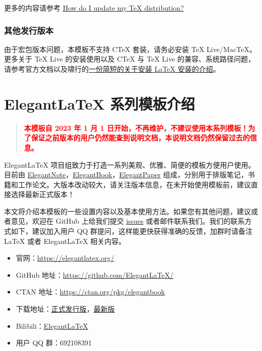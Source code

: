 \documentclass[lang=cn,newtx,10pt,scheme=chinese]{elegantbook}
\begin{document}
更多的内容请参考 \href{https://tex.stackexchange.com/questions/55437/how-do-i-update-my-tex-distribution}{How do I update my \TeX{} distribution?}

\subsection{其他发行版本}

由于宏包版本问题，本模板不支持 C\TeX{} 套装，请务必安装 TeX Live/Mac\TeX{}。更多关于 \TeX{} Live 的安装使用以及 C\TeX{} 与 \TeX{} Live 的兼容、系统路径问题，请参考官方文档以及啸行的\href{https://github.com/OsbertWang/install-latex-guide-zh-cn/releases/}{一份简短的关于安装 \LaTeX{} 安装的介绍}。



\chapter{Elegant\LaTeX{} 系列模板介绍}

\begin{quotation}
  \textbf{\textcolor{red}{本模板自 2023 年 1 月 1 日开始，不再维护，不建议使用本系列模板！为了保证之前版本的用户仍然能查到说明文档，本说明文档仍然保留过去的信息。}}
\end{quotation}

Elegant\LaTeX{} 项目组致力于打造一系列美观、优雅、简便的模板方便用户使用。目前由 \href{https://github.com/ElegantLaTeX/ElegantNote}{ElegantNote}，\href{https://github.com/ElegantLaTeX/ElegantBook}{ElegantBook}，\href{https://github.com/ElegantLaTeX/ElegantPaper}{ElegantPaper} 组成，分别用于排版笔记，书籍和工作论文。大版本改动较大，请关注版本信息，在未开始使用模板前，建议直接选择最新正式版本！


本文将介绍本模板的一些设置内容以及基本使用方法。如果您有其他问题，建议或者意见，欢迎在 GitHub 上给我们提交 \href{https://github.com/ElegantLaTeX/ElegantBook/issues}{issues} 或者邮件联系我们。我们的联系方式如下，建议加入用户 QQ 群提问，这样能更快获得准确的反馈，加群时请备注 \LaTeX{} 或者 Elegant\LaTeX{} 相关内容。
\begin{itemize}
  \item 官网：\href{https://elegantlatex.org/}{https://elegantlatex.org/}
  \item GitHub 地址：\href{https://github.com/ElegantLaTeX/}{https://github.com/ElegantLaTeX/}
  \item CTAN 地址：\href{https://ctan.org/pkg/elegantbook}{https://ctan.org/pkg/elegantbook}
  \item 下载地址：\href{https://github.com/ElegantLaTeX/ElegantBook/releases}{正式发行版}，\href{https://github.com/ElegantLaTeX/ElegantBook/archive/master.zip}{最新版}
  \item Bilibili：\href{https://space.bilibili.com/516479629}{ElegantLaTeX}
  \item 用户 QQ 群：692108391
\end{itemize}
\end{document}
